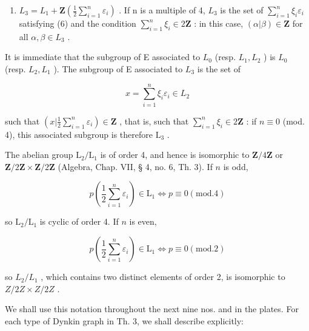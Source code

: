 \begin{enumerate}
\def\labelenumi{\arabic{enumi})}
\setcounter{enumi}{3}
\tightlist
\item
  \(L_{3} = L_{1} + \mathbf{Z}\left(\frac{1}{2} \sum_{i=1}^{n} \varepsilon_{i}\right)\) . If n is a multiple of 4, \(L_{3}\) is the set of \(\sum_{i=1}^{n} \xi_{i} \varepsilon_{i}\) satisfying (6) and the condition \(\sum_{i=1}^{n} \xi_{i} \in 2\mathbf{Z}\) : in this case, \((\alpha | \beta) \in \mathbf{Z}\) for all \(\alpha, \beta \in L_{3}\) .
\end{enumerate}

It is immediate that the subgroup of E associated to \(L_{0}\) (resp. \(L_{1}, L_{2}\) ) is \(L_{0}\) (resp. \(L_{2}, L_{1}\) ). The subgroup of E associated to \(L_{3}\) is the set of

\[
x = \sum_ {i = 1} ^ {n} \xi_ {i} \varepsilon_ {i} \in L _ {2}
\]

such that \((x|\frac{1}{2}\sum_{i = 1}^{n}\varepsilon_i)\in \mathbf{Z}\) , that is, such that \(\sum_{i = 1}^{n}\xi_{i}\in 2\mathbf{Z}\) : if \(n\equiv 0\) (mod. 4), this associated subgroup is therefore \(\mathrm{L}_3\) .

The abelian group \(\mathrm{L}_2 / \mathrm{L}_1\) is of order 4, and hence is isomorphic to \(\mathbf{Z} / 4\mathbf{Z}\) or \(\mathbf{Z} / 2\mathbf{Z} \times \mathbf{Z} / 2\mathbf{Z}\) (Algebra, Chap. VII, § 4, no. 6, Th. 3). If \(n\) is odd,

\[
p (\frac {1}{2} \sum_ {i = 1} ^ {n} \varepsilon_ {i}) \in \mathrm{L} _ {1} \Leftrightarrow p \equiv 0 (\mathrm{mod.} 4)
\]

so \(\mathrm{L}_2 / \mathrm{L}_1\) is cyclic of order 4. If \(n\) is even,

\[
p (\frac {1}{2} \sum_ {i = 1} ^ {n} \varepsilon_ {i}) \in \mathrm{L} _ {1} \Leftrightarrow p \equiv 0 (\mathrm{mod.} 2)
\]

so \(L_{2}/L_{1}\) , which contains two distinct elements of order 2, is isomorphic to \(Z/2Z \times Z/2Z\) .

We shall use this notation throughout the next nine nos. and in the plates. For each type of Dynkin graph in Th. 3, we shall describe explicitly:

